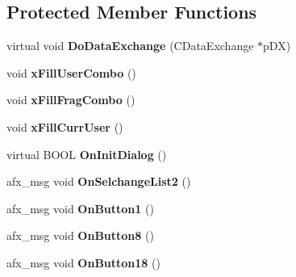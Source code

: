 \subsection*{Protected Member Functions}
\begin{DoxyCompactItemize}
\item 
\hypertarget{class_c_frag_tab_a101ca019441b221b62446f9b079ccc37}{virtual void {\bfseries Do\-Data\-Exchange} (C\-Data\-Exchange $\ast$p\-D\-X)}\label{class_c_frag_tab_a101ca019441b221b62446f9b079ccc37}

\item 
\hypertarget{class_c_frag_tab_a7a9fdfb31aefce0355340a29762d2083}{void {\bfseries x\-Fill\-User\-Combo} ()}\label{class_c_frag_tab_a7a9fdfb31aefce0355340a29762d2083}

\item 
\hypertarget{class_c_frag_tab_a1ce0b304af9c6a48a62b225c8e62c614}{void {\bfseries x\-Fill\-Frag\-Combo} ()}\label{class_c_frag_tab_a1ce0b304af9c6a48a62b225c8e62c614}

\item 
\hypertarget{class_c_frag_tab_a2c6ba80b23fc563faed1ed7712fbd8bc}{void {\bfseries x\-Fill\-Curr\-User} ()}\label{class_c_frag_tab_a2c6ba80b23fc563faed1ed7712fbd8bc}

\item 
\hypertarget{class_c_frag_tab_a98420883a1ef3284a8f93dc53c4cdd6c}{virtual B\-O\-O\-L {\bfseries On\-Init\-Dialog} ()}\label{class_c_frag_tab_a98420883a1ef3284a8f93dc53c4cdd6c}

\item 
\hypertarget{class_c_frag_tab_a75bd331c4146e663a795f02599361150}{afx\-\_\-msg void {\bfseries On\-Selchange\-List2} ()}\label{class_c_frag_tab_a75bd331c4146e663a795f02599361150}

\item 
\hypertarget{class_c_frag_tab_afb2bf24f30ef9b8aaae7b01cf99d980d}{afx\-\_\-msg void {\bfseries On\-Button1} ()}\label{class_c_frag_tab_afb2bf24f30ef9b8aaae7b01cf99d980d}

\item 
\hypertarget{class_c_frag_tab_adec22dc5381abb2b88c913d5a394d7ec}{afx\-\_\-msg void {\bfseries On\-Button8} ()}\label{class_c_frag_tab_adec22dc5381abb2b88c913d5a394d7ec}

\item 
\hypertarget{class_c_frag_tab_acd32e2d0a2e0ef3f78e9bdc7f8cb8e7c}{afx\-\_\-msg void {\bfseries On\-Button18} ()}\label{class_c_frag_tab_acd32e2d0a2e0ef3f78e9bdc7f8cb8e7c}


\end{DoxyCompactItemize}
